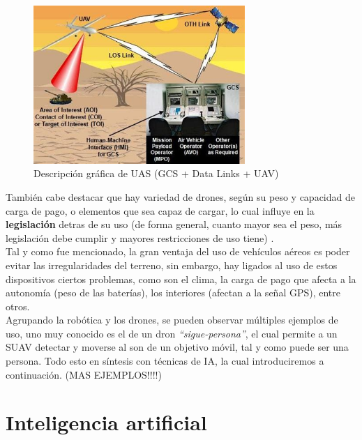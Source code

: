 \begin{figure} [H]
	\begin{center}
	\includegraphics[height=6cm]{imagenes/cap1/7_drone_components.jpeg}
	\end{center}
	\caption[Descripción gráfica de \ac{UAS} (GCS + Data Links + UAV)]{Descripción gráfica de \ac{UAS} (GCS + Data Links + UAV)}
	\label{fig:drone_components}
\end{figure}

También cabe destacar que hay variedad de drones, según su peso y capacidad de carga de pago, o elementos que sea capaz de cargar, lo cual influye en la \textbf{legislación} detras de su uso (de forma general, cuanto mayor sea el peso, más legislación debe cumplir y mayores restricciones de uso tiene) \cite{drone-regulation}.\\

Tal y como fue mencionado, la gran ventaja del uso de vehículos aéreos es poder evitar las irregularidades del terreno, sin embargo, hay ligados al uso de estos dispositivos ciertos problemas, como son el clima, la carga de pago que afecta a la autonomía (peso de las baterías), los interiores (afectan a la señal GPS), entre otros.\\

Agrupando la robótica y los drones, se pueden observar múltiples ejemplos de uso, uno muy conocido es el de un dron \emph{``sigue-persona''}, el cual permite a un \ac{SUAV} detectar y moverse al son de un objetivo móvil, tal y como puede ser una persona. Todo esto en síntesis con técnicas de \ac{IA}, la cual introduciremos a continuación.
(MAS EJEMPLOS!!!!)
\section{Inteligencia artificial}
\label{subsec:inteligencia_artificial}

